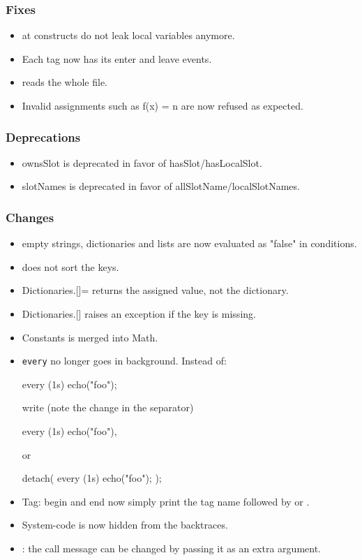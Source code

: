 \subsubsection{Fixes}
\begin{itemize}
\item at constructs do not leak local variables anymore.
\item Each tag now has its enter and leave events.
\item {} reads the whole file.
\item Invalid assignments such as f(x) = n are now refused as expected.
\end{itemize}

\subsubsection{Deprecations}
\begin{itemize}
\item ownsSlot is deprecated in favor of hasSlot/hasLocalSlot.
\item slotNames is deprecated in favor of allSlotName/localSlotNames.
\end{itemize}

\subsubsection{Changes}
\begin{itemize}
\item empty strings, dictionaries and lists are now evaluated as
  "false" in conditions.
\item {} does not sort the keys.
\item Dictionaries.[]= returns the assigned value, not the dictionary.
\item Dictionaries.[] raises an exception if the key is missing.
\item Constants is merged into Math.
\item \lstinline|every| no longer goes in background.  Instead of:

\begin{urbiunchecked}
every (1s) echo("foo");
\end{urbiunchecked}

  \noindent
  write (note the change in the separator)

\begin{urbiunchecked}
every (1s) echo("foo"),
\end{urbiunchecked}

  \noindent
  or

\begin{urbiunchecked}
detach({ every (1s) echo("foo"); });
\end{urbiunchecked}

\item Tag: begin and end now simply print the tag name followed by
   or .
\item System-code is now hidden from the backtraces.
\item {}: the call message can be changed by passing it
  as an extra argument.
\end{itemize}

